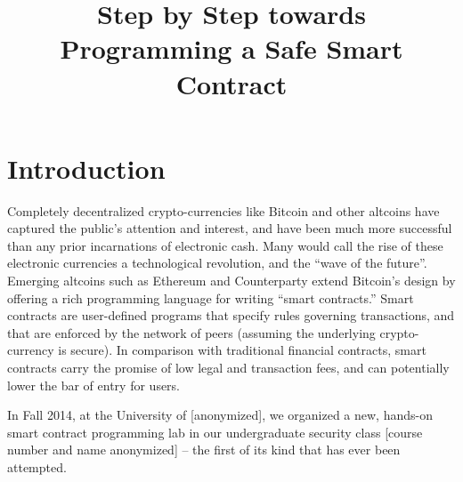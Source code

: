 \documentclass[10pt,twocolumn,letterpaper]{article}
\newcommand{\elaine}[1]{{\color{red}{[elaine: #1]}}}
\begin{document}
\title{Step by Step towards Programming a Safe Smart Contract}

\date{}
\maketitle


\newpage
\section{Introduction}

Completely decentralized crypto-currencies like Bitcoin 
\elaine{cite}
and other altcoins 
\elaine{cite}
have captured the public's attention and interest, 
and have been much more successful than any prior incarnations of electronic
cash. Many would call the rise 
of these electronic currencies a technological revolution, and the ``wave of
the future''.
Emerging altcoins such as Ethereum \elaine{cite} and Counterparty \elaine{cite}
extend Bitcoin's design by offering a rich programming language for 
writing ``smart contracts.'' Smart
contracts are user-defined programs that specify rules 
governing transactions, and that are enforced by
the network of peers (assuming the underlying crypto-currency is secure). 
In comparison with traditional
financial contracts, smart contracts carry the promise of low legal 
and transaction fees, and can potentially
lower the bar of entry for users.

In Fall 2014, at the University of [anonymized], 
we organized a new, hands-on
smart contract programming lab in our undergraduate security
class [course number and name anonymized] -- the first of its
kind that has ever been attempted.



\end{document}
